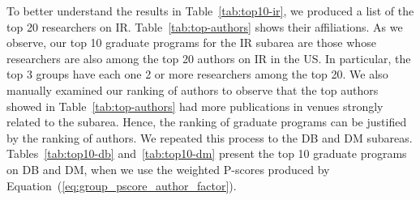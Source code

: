 \documentclass[msc]{ppgccufmg}
\begin{document}
To better understand the results in Table~\ref{tab:top10-ir}, we produced a list of the top 20 researchers on IR. Table~\ref{tab:top-authors} shows their affiliations. As we observe, our top 10 graduate programs for the IR subarea are those whose researchers are also among the top 20 authors on IR in the US. In particular, the top 3 groups have each one 2 or more researchers among the top 20. 
%
We also manually examined our ranking of authors to observe that the top authors showed in Table~\ref{tab:top-authors} had more publications in venues strongly related to the subarea. Hence, the ranking of graduate programs can be justified by the ranking of authors. 
%
We repeated this process to the DB and DM subareas. Tables~\ref{tab:top10-db} and~\ref{tab:top10-dm} present the top 10 graduate programs on DB and DM, when we use the weighted P-scores produced by Equation~(\ref{eq:group_pscore_author_factor}).
\end{document}

